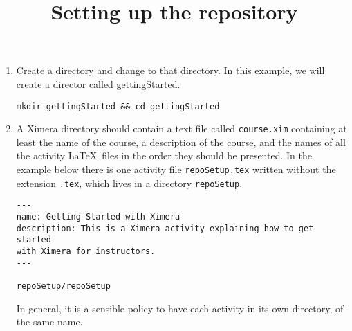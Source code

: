 \documentclass{ximera}
\begin{document}
\title{Setting up the repository}
\begin{enumerate}
\item Create a directory and change to that directory.
In this example, we will create a director called gettingStarted.
\begin{center}
\begin{verbatim}
mkdir gettingStarted && cd gettingStarted
\end{verbatim}
\end{center}
\item A Ximera directory should contain
a text file called \verb!course.xim! containing
at least the name of the course, a description of the course,
and the names of all the activity \LaTeX\ files in the order
they should be presented. In the example below
there is one activity file \verb!repoSetup.tex!
written without the extension \verb!.tex!,
which lives in a directory \verb!repoSetup!.
\begin{verbatim}
---
name: Getting Started with Ximera
description: This is a Ximera activity explaining how to get started
with Ximera for instructors.
---

repoSetup/repoSetup
\end{verbatim}
In general, it is a sensible policy to have each
activity in its own directory, of the same name.

\end{enumerate}
\end{document}
